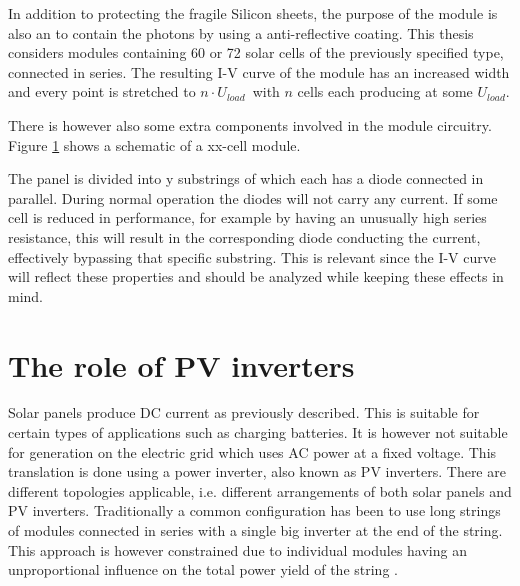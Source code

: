 
In addition to protecting the fragile Silicon sheets, the purpose of the module is also an to contain the photons by using a anti-reflective coating.
This thesis considers modules containing 60 or 72 solar cells of the previously specified type, connected in series.
The resulting I-V curve of the module has an increased width and every point is stretched to $n \cdot U_{load}$ with $n$ cells each producing at some $U_{load}$.

There is however also some extra components involved in the module circuitry.
Figure \ref{} shows a schematic of a xx-cell module.

The panel is divided into y substrings of which each has a diode connected in parallel.
During normal operation the diodes will not carry any current.
If some cell is reduced in performance, for example by having an unusually high series resistance, this will result in the corresponding diode conducting the current, effectively bypassing that specific substring\cite{Roman2006}.
This is relevant since the I-V curve will reflect these properties and should be analyzed while keeping these effects in mind.

\section{The role of PV inverters}
Solar panels produce DC current as previously described.
This is suitable for certain types of applications such as charging batteries.
It is however not suitable for generation on the electric grid which uses AC power at a fixed voltage.
This translation is done using a power inverter, also known as PV inverters.
There are different topologies applicable, i.e. different arrangements of both solar panels and PV inverters.
Traditionally a common configuration has been to use long strings of modules connected in series with a single big inverter at the end of the string.
This approach is however constrained due to individual modules having an unproportional influence on the total power yield of the string \cite{Roman2006}.


